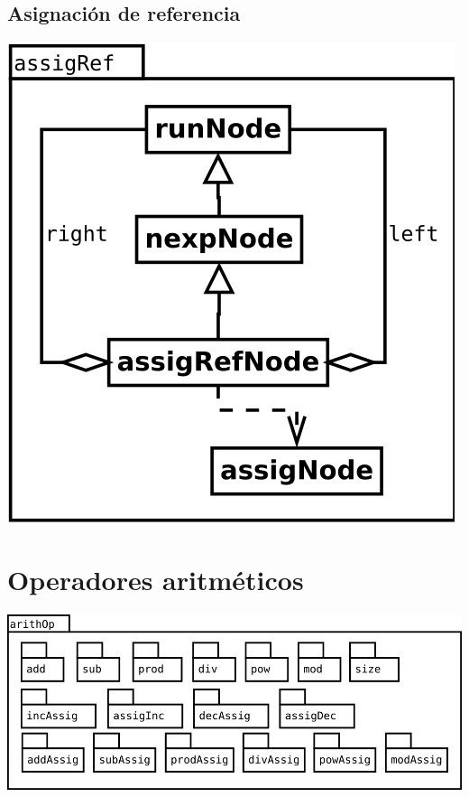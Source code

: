 \subsection {Asignación de referencia}
\begin{center}
\includegraphics[scale=0.4]{assigRef.png} \\
\end{center}

\pagebreak
\section {Operadores aritméticos}
\begin{center}
\includegraphics[scale=0.4]{arithOp-package.png} \\
\end{center}

